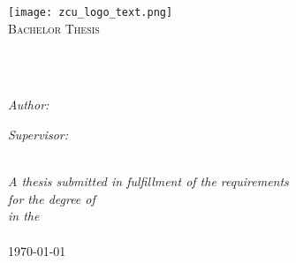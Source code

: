 \frontmatter %

\pagestyle{plain} %


\begin{titlepage}
\begin{center}
\texttt{[image: zcu\_logo\_text.png]} %
\\\vspace{3cm}
\textsc{\Large Bachelor Thesis}\\[0.2cm] 	 %

\HRule \\[0.4cm] %
{\huge \bfseries \ttitle\par}\vspace{0.4cm} %
\HRule \\[1.5cm] %
 
\begin{minipage}[t]{0.45\textwidth}
\begin{flushleft} \large
\emph{Author:}\\
\href{http://www.kitt.evee.cz}{\authorname}
\end{flushleft}
\end{minipage}
\begin{minipage}[t]{0.45\textwidth}
\begin{flushright} \large
\emph{Supervisor:} \\
\href{http://www.kky.zcu.cz/cs/people/smidl-lubos}{\supname}
\end{flushright}
\end{minipage}\\[2.5cm]
 
\large \textit{A thesis submitted in fulfillment of the requirements\\ for the degree of \degreename}\\[0.3cm] %
\textit{in the}\\[0.4cm]
\deptname %
 \\\vspace{2cm}
{\large \today} %
 
\vfill
\end{center}
\end{titlepage}